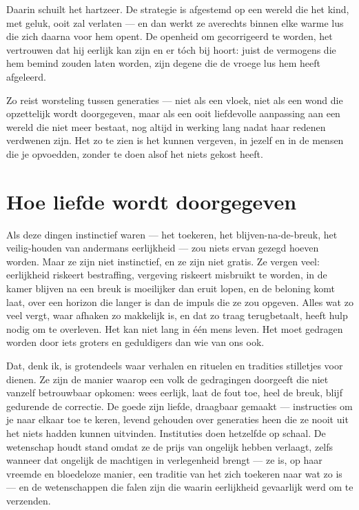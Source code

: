 \documentclass[12pt, a4paper]{article}
\begin{document}
Daarin schuilt het hartzeer. De strategie is afgestemd op een wereld die het kind, met geluk, ooit zal verlaten — en dan werkt ze averechts binnen elke warme lus die zich daarna voor hem opent. De openheid om gecorrigeerd te worden, het vertrouwen dat hij eerlijk kan zijn en er tóch bij hoort: juist de vermogens die hem bemind zouden laten worden, zijn degene die de vroege lus hem heeft afgeleerd.

Zo reist worsteling tussen generaties — niet als een vloek, niet als een wond die opzettelijk wordt doorgegeven, maar als een ooit liefdevolle aanpassing aan een wereld die niet meer bestaat, nog altijd in werking lang nadat haar redenen verdwenen zijn. Het zo te zien is het kunnen vergeven, in jezelf en in de mensen die je opvoedden, zonder te doen alsof het niets gekost heeft.

\section*{Hoe liefde wordt doorgegeven}
Als deze dingen instinctief waren — het toekeren, het blijven-na-de-breuk, het veilig-houden van andermans eerlijkheid — zou niets ervan gezegd hoeven worden. Maar ze zijn niet instinctief, en ze zijn niet gratis. Ze vergen veel: eerlijkheid riskeert bestraffing, vergeving riskeert misbruikt te worden, in de kamer blijven na een breuk is moeilijker dan eruit lopen, en de beloning komt laat, over een horizon die langer is dan de impuls die ze zou opgeven. Alles wat zo veel vergt, waar afhaken zo makkelijk is, en dat zo traag terugbetaalt, heeft hulp nodig om te overleven. Het kan niet lang in één mens leven. Het moet gedragen worden door iets groters en geduldigers dan wie van ons ook.

Dat, denk ik, is grotendeels waar verhalen en rituelen en tradities stilletjes voor dienen. Ze zijn de manier waarop een volk de gedragingen doorgeeft die niet vanzelf betrouwbaar opkomen: wees eerlijk, laat de fout toe, heel de breuk, blijf gedurende de correctie. De goede zijn liefde, draagbaar gemaakt — instructies om je naar elkaar toe te keren, levend gehouden over generaties heen die ze nooit uit het niets hadden kunnen uitvinden. Instituties doen hetzelfde op schaal. De wetenschap houdt stand omdat ze de prijs van ongelijk hebben verlaagt, zelfs wanneer dat ongelijk de machtigen in verlegenheid brengt — ze is, op haar vreemde en bloedeloze manier, een traditie van het zich toekeren naar wat zo is — en de wetenschappen die falen zijn die waarin eerlijkheid gevaarlijk werd om te verzenden.
\end{document}
